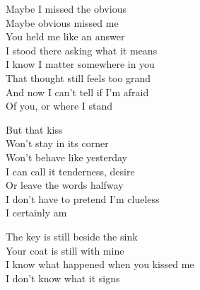 \begin{lyrics}
Maybe I missed the obvious\\
Maybe obvious missed me\\
You held me like an answer\\
I stood there asking what it means\\
I know I matter somewhere in you\\
That thought still feels too grand\\
And now I can't tell if I'm afraid\\
Of you, or where I stand

But that kiss\\
Won't stay in its corner\\
Won't behave like yesterday\\
I can call it tenderness, desire\\
Or leave the words halfway\\
I don't have to pretend I'm clueless\\
I certainly am

The key is still beside the sink\\
Your coat is still with mine\\
I know what happened when you kissed me\\
I don't know what it signs
\end{lyrics}

